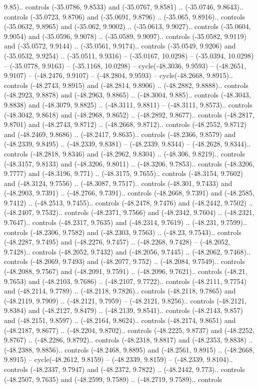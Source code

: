 \begin{scope}[shift={(2.5552, 9.9912)}]
\begin{scope}[shift={(48.1654, -14.8546)}]
9.85).. controls (-35.0786, 9.8533) and (-35.0767, 9.8581) .. (-35.0746, 9.8643).. controls (-35.0723, 9.8706) and (-35.0691, 9.8796) .. (-35.065, 9.8916).. controls (-35.0632, 9.8965) and (-35.062, 9.9002) .. (-35.0613, 9.9027).. controls (-35.0604, 9.9054) and (-35.0596, 9.9078) .. (-35.0589, 9.9097).. controls (-35.0582, 9.9119) and (-35.0572, 9.9144) .. (-35.0561, 9.9174).. controls (-35.0549, 9.9206) and (-35.0532, 9.9254) .. (-35.0511, 9.9316) -- (-35.0167, 10.0298) -- (-35.0394, 10.0298) -- (-35.0778, 9.9163) -- (-35.1168, 10.0298) -- cycle(-48.3036, 9.9593) -- (-48.2651, 9.9107) -- (-48.2476, 9.9107) -- (-48.2804, 9.9593) -- cycle(-48.2668, 9.8915).. controls (-48.2743, 9.8915) and (-48.2814, 9.8906) .. (-48.2882, 9.8888).. controls (-48.2923, 9.8878) and (-48.2963, 9.8865) .. (-48.3004, 9.885).. controls (-48.3043, 9.8838) and (-48.3079, 9.8825) .. (-48.3111, 9.8811) -- (-48.3111, 9.8573).. controls (-48.3042, 9.8618) and (-48.2968, 9.8652) .. (-48.2892, 9.8677).. controls (-48.2817, 9.8701) and (-48.2743, 9.8712) .. (-48.2668, 9.8712).. controls (-48.2552, 9.8712) and (-48.2469, 9.8686) .. (-48.2417, 9.8635).. controls (-48.2366, 9.8579) and (-48.2339, 9.8495) .. (-48.2339, 9.8381) -- (-48.2339, 9.8344) -- (-48.2628, 9.8344).. controls (-48.2818, 9.8346) and (-48.2962, 9.8304) .. (-48.306, 9.8219).. controls (-48.3157, 9.8133) and (-48.3206, 9.8011) .. (-48.3206, 9.7853).. controls (-48.3206, 9.7777) and (-48.3196, 9.771) .. (-48.3175, 9.7655).. controls (-48.3154, 9.7602) and (-48.3124, 9.7556) .. (-48.3087, 9.7517).. controls (-48.301, 9.7433) and (-48.2903, 9.7391) .. (-48.2766, 9.7391).. controls (-48.2668, 9.7391) and (-48.2585, 9.7412) .. (-48.2513, 9.7455).. controls (-48.2478, 9.7476) and (-48.2442, 9.7502) .. (-48.2407, 9.7532).. controls (-48.2371, 9.7566) and (-48.2342, 9.7604) .. (-48.2321, 9.7647).. controls (-48.2317, 9.7635) and (-48.2314, 9.7619) .. (-48.231, 9.7599).. controls (-48.2306, 9.7582) and (-48.2303, 9.7563) .. (-48.23, 9.7543).. controls (-48.2287, 9.7495) and (-48.2276, 9.7457) .. (-48.2268, 9.7428) -- (-48.2052, 9.7428).. controls (-48.2052, 9.7432) and (-48.2056, 9.7445) .. (-48.2062, 9.7468).. controls (-48.2069, 9.7493) and (-48.2077, 9.752) .. (-48.2084, 9.7549).. controls (-48.2088, 9.7567) and (-48.2091, 9.7591) .. (-48.2096, 9.7621).. controls (-48.21, 9.7653) and (-48.2103, 9.7686) .. (-48.2107, 9.7722).. controls (-48.2111, 9.7754) and (-48.2114, 9.7789) .. (-48.2118, 9.7826).. controls (-48.2118, 9.7865) and (-48.2119, 9.7909) .. (-48.2121, 9.7959) -- (-48.2121, 9.8256).. controls (-48.2121, 9.8384) and (-48.2127, 9.8479) .. (-48.2139, 9.8541).. controls (-48.2143, 9.857) and (-48.2151, 9.8597) .. (-48.2164, 9.8624).. controls (-48.2174, 9.8651) and (-48.2187, 9.8677) .. (-48.2204, 9.8702).. controls (-48.2225, 9.8737) and (-48.2252, 9.8767) .. (-48.2286, 9.8792).. controls (-48.2318, 9.8817) and (-48.2353, 9.8838) .. (-48.2388, 9.8856).. controls (-48.2468, 9.8895) and (-48.2561, 9.8915) .. (-48.2668, 9.8915) -- cycle(-48.2612, 9.8159) -- (-48.2339, 9.8159) -- (-48.2339, 9.8104).. controls (-48.2337, 9.7947) and (-48.2372, 9.7822) .. (-48.2442, 9.773).. controls (-48.2507, 9.7635) and (-48.2599, 9.7589) .. (-48.2719, 9.7589).. controls 
\end{scope}
\end{scope}

